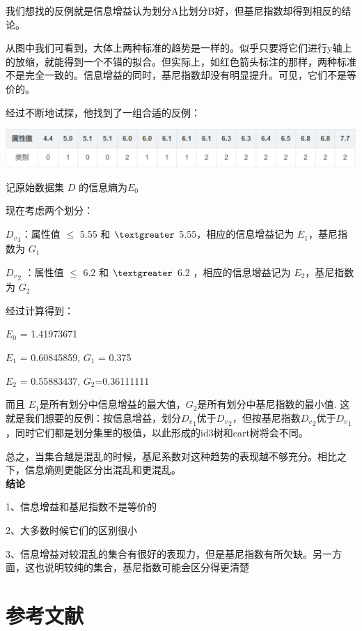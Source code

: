 \documentclass[lang=cn,11pt]{elegantpaper}
\begin{document}
我们想找的反例就是信息增益认为划分A比划分B好，但基尼指数却得到相反的结论。

从图中我们可看到，大体上两种标准的趋势是一样的。似乎只要将它们进行y轴上的放缩，就能得到一个不错的拟合。但实际上，如红色箭头标注的那样，两种标准不是完全一致的。信息增益的同时，基尼指数却没有明显提升。可见，它们不是等价的。

经过不断地试探，他找到了一组合适的反例：
\begin{center}
\includegraphics[scale=0.4]{pic3.png}\\
\end{center}

记原始数据集 $D$ 的信息熵为$E_0$​

现在考虑两个划分：

${D_v}_1$​ ：属性值 $\le$ 5.55 和 $\textgreater$ 5.55，相应的信息增益记为 $E_1$ ​，基尼指数为 $G_1$

${D_v}_2$ ：属性值 $\le$ 6.2 和 $\textgreater$ 6.2 ，相应的信息增益记为 $E_2$​，基尼指数为 $G_2$

经过计算得到：

$E_{0}$ = 1.41973671

$E_{1}$ = 0.60845859, \quad $G_{1}$ = 0.375

$E_{2}$ = 0.55883437, \quad $G_{2}$=0.36111111 

而且 $E_{1}$​是所有划分中信息增益的最大值，$ G_{2}$​是所有划分中基尼指数的最小值.
这就是我们想要的反例：按信息增益，划分${D_v}_1$​优于${D_v}_2$，但按基尼指数${D_v}_2$优于${D_v}_1$​，同时它们都是划分集里的极值，以此形成的id3树和cart树将会不同。

总之，当集合越是混乱的时候，基尼系数对这种趋势的表现越不够充分。相比之下，信息熵则更能区分出混乱和更混乱。\\
\textbf{结论}

    1、信息增益和基尼指数不是等价的

    2、大多数时候它们的区别很小

    3、信息增益对较混乱的集合有很好的表现力，但是基尼指数有所欠缺。另一方面，这也说明较纯的集合，基尼指数可能会区分得更清楚


\section{参考文献}


\end{document}
